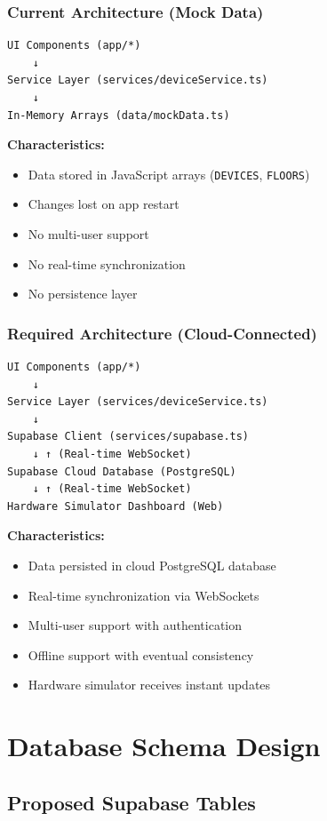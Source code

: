 \documentclass[12pt,a4paper]{article}
\begin{document}
\subsubsection{Current Architecture (Mock Data)}
\begin{verbatim}
UI Components (app/*)
    ↓
Service Layer (services/deviceService.ts)
    ↓
In-Memory Arrays (data/mockData.ts)
\end{verbatim}

\textbf{Characteristics:}
\begin{itemize}
    \item Data stored in JavaScript arrays (\texttt{DEVICES}, \texttt{FLOORS})
    \item Changes lost on app restart
    \item No multi-user support
    \item No real-time synchronization
    \item No persistence layer
\end{itemize}

\subsubsection{Required Architecture (Cloud-Connected)}
\begin{verbatim}
UI Components (app/*)
    ↓
Service Layer (services/deviceService.ts)
    ↓
Supabase Client (services/supabase.ts)
    ↓ ↑ (Real-time WebSocket)
Supabase Cloud Database (PostgreSQL)
    ↓ ↑ (Real-time WebSocket)
Hardware Simulator Dashboard (Web)
\end{verbatim}

\textbf{Characteristics:}
\begin{itemize}
    \item Data persisted in cloud PostgreSQL database
    \item Real-time synchronization via WebSockets
    \item Multi-user support with authentication
    \item Offline support with eventual consistency
    \item Hardware simulator receives instant updates
\end{itemize}

\newpage
\section{Database Schema Design}

\subsection{Proposed Supabase Tables}
\end{document}
